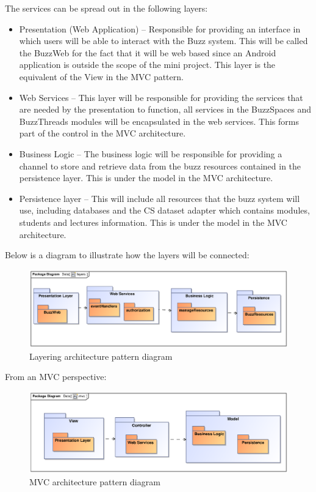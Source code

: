 \documentclass[a4paper]{article}
\begin{document}
The services can be spread out in the following layers:
\begin{itemize}
			\item Presentation (Web Application) – Responsible for providing an interface in which users will be able to interact with the Buzz system. This will be called the BuzzWeb for the fact that it will be web based since an Android application is outside the scope of the mini project. This layer is the equivalent of the View in the MVC pattern.
			\item Web Services – This layer will be responsible for providing the services that are needed by the presentation to function, all services in the BuzzSpaces and BuzzThreads modules will be encapsulated in the web services. This forms part of the control in the MVC architecture.
			\item Business Logic – The business logic will be responsible for providing a channel to store and retrieve data from the buzz resources contained in the persistence layer. This is under the model in the MVC architecture.
			\item Persistence layer – This will include all resources that the buzz system will use, including databases and the CS dataset adapter which contains modules, students and lectures information. This is under the model in the MVC architecture.  \\[1em]
\end{itemize}

Below is a diagram to illustrate how the layers will be connected:

\begin{figure}[H]
\includegraphics[width=\textwidth]{layers.eps}
\caption{Layering architecture pattern diagram \label{overflow}}
\end{figure}


From an MVC perspective:

\begin{figure}[H]
\includegraphics[width=\textwidth]{mvc.eps}
\caption{MVC architecture pattern diagram \label{overflow}}
\end{figure}
\end{document}
